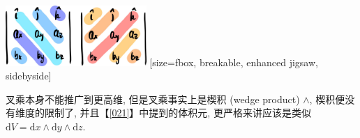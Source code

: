 \begin{tcolorbox}[size=fbox, breakable, enhanced jigsaw]
  \includegraphics[width=0.4\textwidth]{img/image-20240104090600239.png}
  [size=fbox, breakable, enhanced jigsaw, sidebyside]
\end{tcolorbox}

叉乘本身不能推广到更高维, 但是叉乘事实上是楔积 (wedge product)
\(\wedge\), 楔积便没有维度的限制了, 并且【\ref{021}】中提到的体积元,
更严格来讲应该是类似
\(\mathrm{d}V=\mathrm{d}x\wedge\mathrm{d}y\wedge\mathrm{d}z\).

